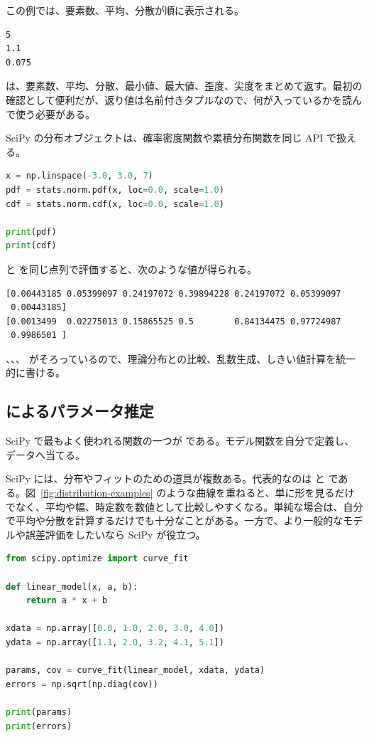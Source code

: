 この例では、要素数、平均、分散が順に表示される。

\begin{lstlisting}[numbers=none, xleftmargin=2\zw]
5
1.1
0.075
\end{lstlisting}

 は、要素数、平均、分散、最小値、最大値、歪度、尖度をまとめて返す。最初の確認として便利だが、返り値は名前付きタプルなので、何が入っているかを読んで使う必要がある。

SciPy の分布オブジェクトは、確率密度関数や累積分布関数を同じ API で扱える。

\begin{lstlisting}[language=Python]
x = np.linspace(-3.0, 3.0, 7)
pdf = stats.norm.pdf(x, loc=0.0, scale=1.0)
cdf = stats.norm.cdf(x, loc=0.0, scale=1.0)

print(pdf)
print(cdf)
\end{lstlisting}

 と  を同じ点列で評価すると、次のような値が得られる。

\begin{lstlisting}[numbers=none, xleftmargin=2\zw]
[0.00443185 0.05399097 0.24197072 0.39894228 0.24197072 0.05399097
 0.00443185]
[0.0013499  0.02275013 0.15865525 0.5        0.84134475 0.97724987
 0.9986501 ]
\end{lstlisting}

、、、 がそろっているので、理論分布との比較、乱数生成、しきい値計算を統一的に書ける。

\subsection{ によるパラメータ推定}

SciPy で最もよく使われる関数の一つが  である。モデル関数を自分で定義し、データへ当てる。

SciPy には、分布やフィットのための道具が複数ある。代表的なのは  と  である。図~\ref{fig:distribution-examples} のような曲線を重ねると、単に形を見るだけでなく、平均や幅、時定数を数値として比較しやすくなる。単純な場合は、自分で平均や分散を計算するだけでも十分なことがある。一方で、より一般的なモデルや誤差評価をしたいなら SciPy が役立つ。

\begin{lstlisting}[language=Python]
from scipy.optimize import curve_fit

def linear_model(x, a, b):
    return a * x + b

xdata = np.array([0.0, 1.0, 2.0, 3.0, 4.0])
ydata = np.array([1.1, 2.0, 3.2, 4.1, 5.1])

params, cov = curve_fit(linear_model, xdata, ydata)
errors = np.sqrt(np.diag(cov))

print(params)
print(errors)
\end{lstlisting}

